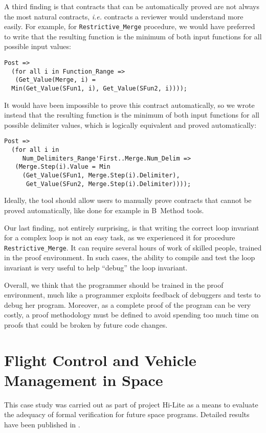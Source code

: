 \documentclass[10pt,a4paper,twocolumn]{article}
\newcommand{\hilite}{Hi-Lite\xspace}
\newcommand{\ie}{\textit{i.e.}\xspace}
\begin{document}
A third finding is that contracts that can be automatically proved are
not always the most natural contracts, \ie contracts a reviewer would
understand more easily. For example, for \verb|Restrictive_Merge|
procedure, we would have preferred to write that the resulting
function is the minimum of both input functions for all possible input
values:
\begin{lstlisting}
Post =>
  (for all i in Function_Range =>
   (Get_Value(Merge, i) =
  Min(Get_Value(SFun1, i), Get_Value(SFun2, i))));
\end{lstlisting}
It would have been impossible to prove this contract automatically, so
we wrote instead that the resulting function is the minimum of both
input functions for all possible delimiter values, which is logically
equivalent and proved automatically:
\begin{lstlisting}
Post =>
  (for all i in
     Num_Delimiters_Range'First..Merge.Num_Delim =>
   (Merge.Step(i).Value = Min
     (Get_Value(SFun1, Merge.Step(i).Delimiter),
      Get_Value(SFun2, Merge.Step(i).Delimiter))));
\end{lstlisting}
Ideally, the tool should allow users to manually prove contracts that
cannot be proved automatically, like done for example in B~Method
tools.

Our last finding, not entirely surprising, is that writing the correct
loop invariant for a complex loop is not an easy task, as we
experienced it for procedure \verb|Restrictive_Merge|. It can require
several hours of work of skilled people, trained in the proof
environment. In such cases, the ability to compile and test the loop
invariant is very useful to help ``debug'' the loop invariant.

Overall, we think that the programmer should be trained in the proof
environment, much like a programmer exploits feedback of debuggers and
tests to debug her program. Moreover, as a complete proof of the
program can be very costly, a proof methodology must be defined to
avoid spending too much time on proofs that could be broken by future
code changes.

\section{Flight Control and Vehicle Management in Space}
\label{sec:space}

This case study was carried out as part of project \hilite as a means
to evaluate the adequacy of formal verification for future space
programs. Detailed results have been published in
\cite{lesens:2013:dasia}.
\end{document}
